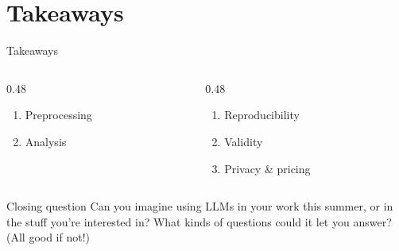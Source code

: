 \documentclass[aspectratio=169,t]{beamer}
\begin{document}
\section{Takeaways}
\roadmapframe

\begin{frame}{Takeaways}
    \begin{columns}[T,onlytextwidth]
        \begin{column}{0.48\textwidth}
            \textbf{}
            \begin{enumerate}
                \item Preprocessing
                \item Analysis
            \end{enumerate}
        \end{column}
        \begin{column}{0.48\textwidth}
            \textbf{}
            \begin{enumerate}
                \item Reproducibility
                \item Validity
                \item Privacy \& pricing
            \end{enumerate}
        \end{column}
    \end{columns}
    \vspace{1em}
    \begin{alertblock}{Closing question}
        Can you imagine using LLMs in your work this summer, or in the stuff
        you're interested in? What kinds of questions could it let you answer?
        (All good if not!)
    \end{alertblock}
\end{frame}

\end{document}
